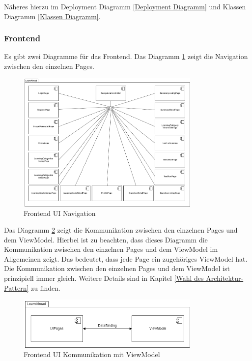 \noindent
Näheres hierzu im Deployment Diagramm \ref*{Deployment Diagramm} und Klassen Diagramm \ref*{Klassen Diagramm}.
\newpage
\subsubsection{Frontend}
Es gibt zwei Diagramme für das Frontend. Das Diagramm \ref*{fig:FrontendUINavigation} zeigt die Navigation zwischen den einzelnen Pages.
\begin{figure}[H]
    \centering
    \includegraphics[width=0.8\textwidth]{images/diagramme/FrontEndKomposition.png}
    \caption{Frontend UI Navigation}
    \label{fig:FrontendUINavigation}
\end{figure}
\noindent
Das Diagramm \ref*{fig:FrontendUIViewModel} zeigt die Kommunikation zwischen den einzelnen Pages und dem ViewModel. Hierbei ist zu beachten, dass dieses Diagramm die Kommunikation zwischen den einzelnen Pages und dem ViewModel im Allgemeinen zeigt. Das bedeutet, dass jede Page ein zugehöriges ViewModel hat. Die Kommunikation zwischen den einzelnen Pages und dem ViewModel ist prinzipiell immer gleich. Weitere Details sind in Kapitel \ref*{Wahl des Architektur-Pattern} zu finden. \newline
\begin{figure}[H]
    \centering
    \includegraphics[width=0.8\textwidth]{images/diagramme/UIPagesMitViewModel.png}
    \caption{Frontend UI Kommunikation mit ViewModel}
    \label{fig:FrontendUIViewModel}
\end{figure}
